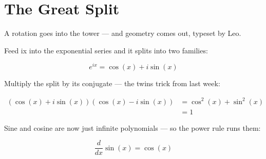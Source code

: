 
\section{The Great Split}

A rotation goes into the tower — and geometry comes out, typeset by Leo.

Feed ix into the exponential series and it splits into two families:

$$ e^{ix} = \cos(x) + i\sin(x) $$

Multiply the split by its conjugate — the twins trick from last week:

$$ \begin{align*}
\left(\cos(x) + i\sin(x)\right)\left(\cos(x) - i\sin(x)\right) &= \cos^2(x) + \sin^2(x) \\
&= 1
\end{align*} $$

Sine and cosine are now just infinite polynomials — so the power rule runs them:

$$ \frac{d}{dx} \sin(x) = \cos(x) $$
